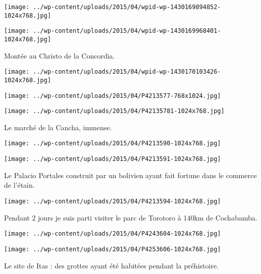 \centerline{\texttt{[image: ../wp-content/uploads/2015/04/wpid-wp-1430169894852-1024x768.jpg]} } 
 \newline
 \newline
\centerline{\texttt{[image: ../wp-content/uploads/2015/04/wpid-wp-1430169968401-1024x768.jpg]} } 
 \newline
 Montée au Christo de la Concordia. \newline
 \newline
\centerline{\texttt{[image: ../wp-content/uploads/2015/04/wpid-wp-1430170103426-1024x768.jpg]} } 
 \newline
 \newline
\centerline{\texttt{[image: ../wp-content/uploads/2015/04/P4213577-768x1024.jpg]} } 
 \newline
 \newline
\centerline{\texttt{[image: ../wp-content/uploads/2015/04/P42135781-1024x768.jpg]} } 
 \newline
 Le marché de la Cancha, immense. \newline
 \newline
\centerline{\texttt{[image: ../wp-content/uploads/2015/04/P4213590-1024x768.jpg]} } 
 \newline
 \newline
\centerline{\texttt{[image: ../wp-content/uploads/2015/04/P4213591-1024x768.jpg]} } 
 \newline
 Le Palacio Portales construit par un bolivien ayant fait fortune dans le commerce de l'étain. \newline
 \newline
\centerline{\texttt{[image: ../wp-content/uploads/2015/04/P4213594-1024x768.jpg]} } 
 \newline
 Pendant 2 jours je suis parti visiter le parc de Torotoro à 140km de Cochabamba. \newline
 \newline
\centerline{\texttt{[image: ../wp-content/uploads/2015/04/P4243604-1024x768.jpg]} } 
 \newline
 \newline
\centerline{\texttt{[image: ../wp-content/uploads/2015/04/P4253606-1024x768.jpg]} } 
 \newline
 Le site de Itas : des grottes ayant été habitées pendant la préhistoire. \newline
 \newline
